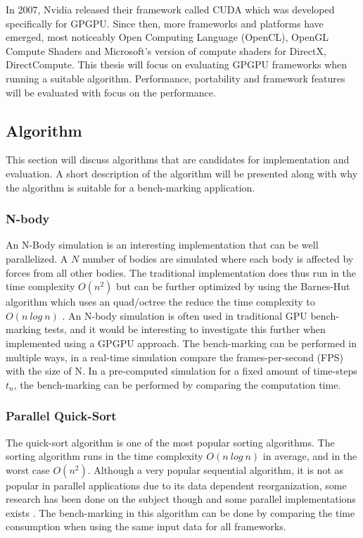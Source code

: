 \documentclass{article}
\begin{document}
In 2007, Nvidia released their framework called CUDA which was developed specifically for GPGPU. Since then, more frameworks and platforms have emerged, most noticeably Open Computing Language (OpenCL), OpenGL Compute Shaders and Microsoft's version of compute shaders for DirectX, DirectCompute. This thesis will focus on evaluating GPGPU frameworks when running a suitable algorithm. Performance, portability and framework features will be evaluated with focus on the performance.

\subsection{Algorithm}
This section will discuss algorithms that are candidates for implementation and evaluation. A short description of the algorithm will be presented along with why the algorithm is suitable for a bench-marking application.

\subsubsection{N-body}
An N-Body simulation is an interesting implementation that can be well parallelized. A $N$ number of bodies are simulated where each body is affected by forces from all other bodies. The traditional implementation does thus run in the time complexity $O(n^2)$ but can be further optimized by using the Barnes-Hut algorithm which uses an quad/octree the reduce the time complexity to $O(n \ log \ n)$ \cite{barnes1986hierarchical}. An N-body simulation is often used in traditional GPU bench-marking tests, and it would be interesting to investigate this further when implemented using a GPGPU approach. The bench-marking can be performed in multiple ways, in a real-time simulation compare the frames-per-second (FPS) with the size of N. In a pre-computed simulation for a fixed amount of time-steps $t_n$, the bench-marking can be performed by comparing the computation time.


\subsubsection{Parallel Quick-Sort}
The quick-sort algorithm is one of the most popular sorting algorithms. The sorting algorithm runs in the time complexity  $O(n \ log \ n)$ in average, and in the worst case  $O(n^2)$. Although a very popular sequential algorithm, it is not as popular in parallel applications due to its data dependent reorganization, some research has been done on the subject though and some parallel implementations exists \cite{sanders1997efficient}\cite{tsigas2003simple}\cite{manca2016cuda}. The bench-marking in this algorithm can be done by comparing the time consumption when using the same input data for all frameworks.
\end{document}
